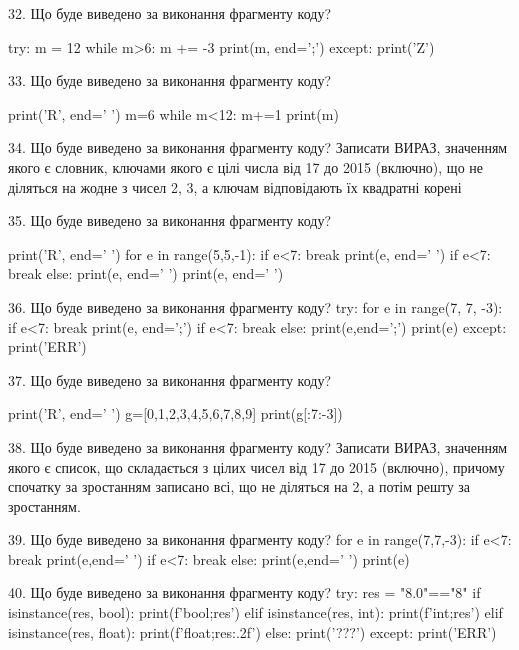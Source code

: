 \documentclass[11pt]{article}
\begin{document}

32. Що буде виведено за виконання фрагменту коду?

try:
    m = 12
    while m>6:
        m += -3
    print(m, end=';')
except:
    print('Z')



33. Що буде виведено за виконання фрагменту коду?

print('R', end=' ')
m=6
while m<12:
    m+=1
print(m)



34. Що буде виведено за виконання фрагменту коду?
Записати ВИРАЗ, значенням якого є словник, ключами якого є цілі числа від 17 до 2015 (включно), що не діляться на жодне з чисел 2, 3, а ключам відповідають їх квадратні корені 


35. Що буде виведено за виконання фрагменту коду?

print('R', end=' ')
for e in range(5,5,-1):
    if e<7:
        break
        print(e, end=' ')
    if e<7:
        break
    else:
        print(e, end=' ')
    print(e, end=' ')


36. Що буде виведено за виконання фрагменту коду?
try:
    for e in range(7, 7, -3):
        if e<7:
            break
        print(e, end=';')
        if e<7:
            break
    else:
        print(e,end=';')
    print(e)
except:
    print('ERR')


37. Що буде виведено за виконання фрагменту коду?

print('R', end=' ')
g=[0,1,2,3,4,5,6,7,8,9]
print(g[:7:-3])



38. Що буде виведено за виконання фрагменту коду?
Записати ВИРАЗ, значенням якого є список, що складається з цілих чисел від 17 до 2015 (включно), причому спочатку за зростанням записано всі, що не діляться на 2, а потім решту за зростанням.

39. Що буде виведено за виконання фрагменту коду?
for e in range(7,7,-3):
    if e<7:
        break
        print(e,end=' ')
    if e<7:
        break
    else:
        print(e,end=' ')
    print(e)


40. Що буде виведено за виконання фрагменту коду?
try:
    res = "8.0"=="8"
    if isinstance(res, bool):
        print(f'bool;{res}')
    elif isinstance(res, int):
        print(f'int;{res}')
    elif isinstance(res, float):
        print(f'float;{res:.2f}')
    else:
        print('???')
except:
    print('ERR')
\end{document}
